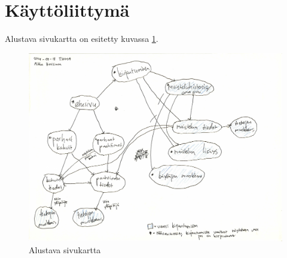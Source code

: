 \documentclass[a4paper,titlepage]{article}
\begin{document}
\section{Käyttöliittymä}

Alustava sivukartta on esitetty kuvassa \ref{fig:sivukartta}.

\begin{figure}[ht]
  \includegraphics[width=12cm]{ui/sitemap}
  \caption{Alustava sivukartta}
  \label{fig:sivukartta}
\end{figure}
\end{document}

